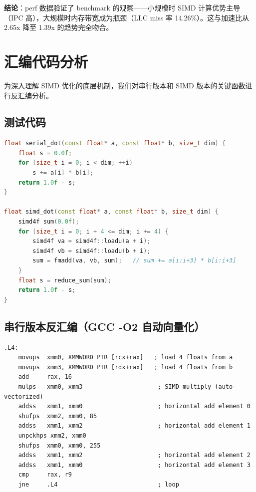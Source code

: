 \documentclass[a4paper]{article}
\begin{document}
\textbf{结论}：perf 数据验证了 benchmark 的观察——小规模时 SIMD 计算优势主导（IPC 高），大规模时内存带宽成为瓶颈（LLC miss 率 14.26\%）。这与加速比从 2.65x 降至 1.39x 的趋势完全吻合。

\section{汇编代码分析}

为深入理解 SIMD 优化的底层机制，我们对串行版本和 SIMD 版本的关键函数进行反汇编分析。

\subsection{测试代码}

\begin{lstlisting}[language=C++]
float serial_dot(const float* a, const float* b, size_t dim) {
    float s = 0.0f;
    for (size_t i = 0; i < dim; ++i)
        s += a[i] * b[i];
    return 1.0f - s;
}

float simd_dot(const float* a, const float* b, size_t dim) {
    simd4f sum(0.0f);
    for (size_t i = 0; i + 4 <= dim; i += 4) {
        simd4f va = simd4f::loadu(a + i);
        simd4f vb = simd4f::loadu(b + i);
        sum = fmadd(va, vb, sum);   // sum += a[i:i+3] * b[i:i+3]
    }
    float s = reduce_sum(sum);
    return 1.0f - s;
}
\end{lstlisting}

\subsection{串行版本反汇编（GCC -O2 自动向量化）}

\begin{lstlisting}[language={[x86masm]Assembler}, title=serial\_dot 反汇编]
.L4:
    movups  xmm0, XMMWORD PTR [rcx+rax]   ; load 4 floats from a
    movups  xmm3, XMMWORD PTR [rdx+rax]   ; load 4 floats from b
    add     rax, 16
    mulps   xmm0, xmm3                     ; SIMD multiply (auto-vectorized)
    addss   xmm1, xmm0                     ; horizontal add element 0
    shufps  xmm2, xmm0, 85
    addss   xmm1, xmm2                     ; horizontal add element 1
    unpckhps xmm2, xmm0
    shufps  xmm0, xmm0, 255
    addss   xmm1, xmm2                     ; horizontal add element 2
    addss   xmm1, xmm0                     ; horizontal add element 3
    cmp     rax, r9
    jne     .L4                            ; loop
\end{lstlisting}
\end{document}
